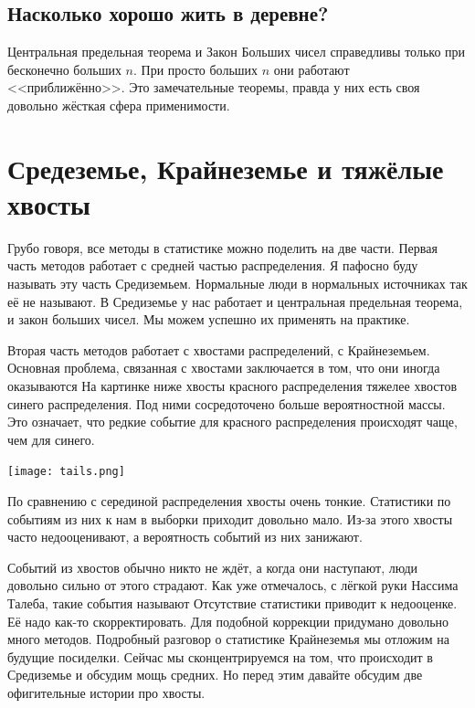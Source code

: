 \documentclass[12pt, a4paper, oneside]{article}
\begin{document}


\subsection{Насколько хорошо жить в деревне?} 

Центральная предельная теорема и Закон Больших чисел справедливы только при бесконечно больших $n$. При просто больших $n$ они работают <<приближённо>>. Это замечательные теоремы, правда у них есть своя довольно жёсткая сфера применимости. 


\section{Средеземье, Крайнеземье и тяжёлые хвосты}

Грубо говоря, все методы в статистике можно поделить на две части. Первая часть методов работает с средней частью распределения. Я пафосно буду называть эту часть Средиземьем. Нормальные люди в нормальных источниках так её не называют. В Средиземье у нас работает и центральная предельная теорема, и закон больших чисел. Мы можем успешно их применять на практике. 

Вторая часть методов работает с хвостами распределений, с Крайнеземьем. Основная проблема, связанная с хвостами заключается в том, что они иногда оказываются  На картинке ниже хвосты красного распределения тяжелее хвостов синего распределения. Под ними сосредоточено больше вероятностной массы. Это означает, что редкие событие для красного распределения происходят чаще, чем для синего.

\begin{center} 
\texttt{[image: tails.png]}
\end{center} 

По сравнению с серединой распределения хвосты очень тонкие. Статистики по событиям из них к нам в выборки приходит довольно мало. Из-за этого хвосты часто недооценивают, а вероятность событий из них занижают. 

Событий из хвостов обычно никто не ждёт, а когда они наступают, люди довольно сильно от этого страдают. Как уже отмечалось, с лёгкой руки Нассима Талеба, такие события называют  Отсутствие статистики приводит к недооценке. Её надо как-то скорректировать. Для подобной коррекции придумано довольно много методов. Подробный разговор о статистике Крайнеземья мы отложим на будущие посиделки. Сейчас мы сконцентрируемся на том, что происходит в Средиземье и обсудим мощь средних. Но перед этим давайте обсудим две офигительные истории про хвосты. 
\end{document}
